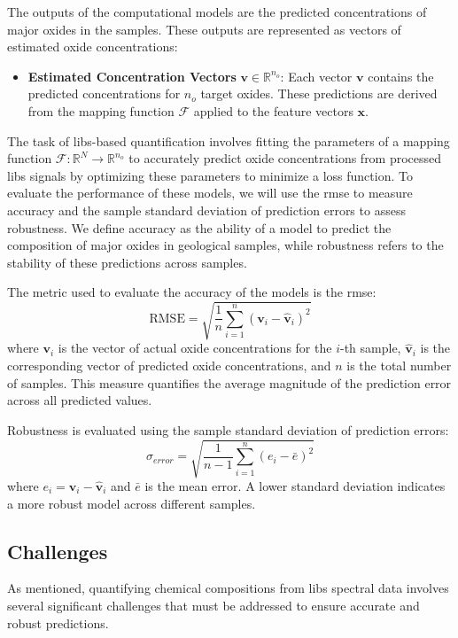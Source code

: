 The outputs of the computational models are the predicted concentrations of major oxides in the samples.
These outputs are represented as vectors of estimated oxide concentrations:

\begin{itemize}
    \item \textbf{Estimated Concentration Vectors} $\mathbf{v} \in \mathbb{R}^{n_o}$: Each vector $\mathbf{v}$ contains the predicted concentrations for $n_o$ target oxides. These predictions are derived from the mapping function $\mathcal{F}$ applied to the feature vectors $\mathbf{x}$.
\end{itemize}

The task of \gls{libs}-based quantification involves fitting the parameters of a mapping function $\mathcal{F}: \mathbb{R}^N \rightarrow \mathbb{R}^{n_o}$ to accurately predict oxide concentrations from processed \gls{libs} signals by optimizing these parameters to minimize a loss function.
To evaluate the performance of these models, we will use the \gls{rmse} to measure accuracy and the sample standard deviation of prediction errors to assess robustness.
We define accuracy as the ability of a model to predict the composition of major oxides in geological samples, while robustness refers to the stability of these predictions across samples.

The metric used to evaluate the accuracy of the models is the \gls{rmse}:
\[
\text{RMSE} = \sqrt{\frac{1}{n} \sum_{i=1}^{n} (\mathbf{v}_i - \hat{\mathbf{v}}_i)^2}
\]
where \( \mathbf{v}_i \) is the vector of actual oxide concentrations for the \( i \)-th sample, \( \hat{\mathbf{v}}_i \) is the corresponding vector of predicted oxide concentrations, and \( n \) is the total number of samples. 
This measure quantifies the average magnitude of the prediction error across all predicted values.

Robustness is evaluated using the sample standard deviation of prediction errors:
\[
\sigma_{error} = \sqrt{\frac{1}{n-1} \sum_{i=1}^{n} (e_i - \bar{e})^2}
\]
where \( e_i = \mathbf{v}_i - \hat{\mathbf{v}}_i \) and \( \bar{e} \) is the mean error.
A lower standard deviation indicates a more robust model across different samples.

\subsection{Challenges}
As mentioned, quantifying chemical compositions from \gls{libs} spectral data involves several significant challenges that must be addressed to ensure accurate and robust predictions.

